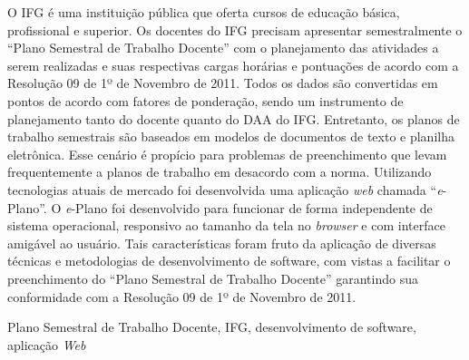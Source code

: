 O \acf{IFG} é uma instituição pública que oferta cursos de educação básica, profissional e superior. 
Os docentes do \ac{IFG} precisam apresentar semestralmente o ``Plano Semestral de Trabalho Docente'' com o planejamento das atividades a serem realizadas e suas respectivas cargas horárias e pontuações de acordo com a Resolução 09 de 1º de Novembro de 2011.
Todos os dados são convertidas em pontos de acordo com fatores de ponderação, sendo um instrumento de planejamento tanto do docente quanto do \acf{DAA} do \ac{IFG}. 
Entretanto, os planos de trabalho semestrais são baseados em modelos de documentos de texto e planilha eletrônica.
Esse cenário é propício para problemas de preenchimento que levam frequentemente a planos de trabalho em desacordo com a norma.
Utilizando tecnologias atuais de mercado foi desenvolvida uma aplicação \textit{web} chamada ``\textit{e}-Plano''.
O \textit{e}-Plano foi desenvolvido para funcionar de forma independente de sistema operacional, responsivo ao tamanho da tela no \textit{browser} e com interface amigável ao usuário.
Tais características foram fruto da aplicação de diversas técnicas e metodologias de desenvolvimento de software, com vistas a facilitar o preenchimento do ``Plano Semestral de Trabalho Docente'' garantindo sua conformidade com a Resolução 09 de 1º de Novembro de 2011.

\begin{keywords}
Plano Semestral de Trabalho Docente, IFG, desenvolvimento de software, aplicação \textit{Web} 
\end{keywords}